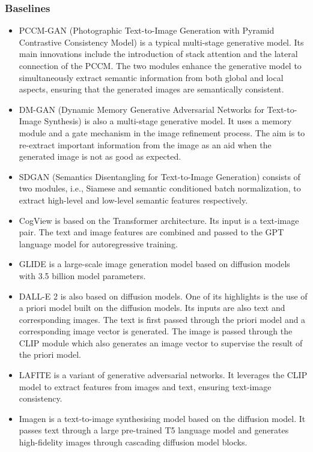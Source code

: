 \documentclass{article}
\begin{document}
\subsubsection{Baselines}
\begin{itemize}
    \item PCCM-GAN \cite{Qi2021PCCMGANPT} (Photographic Text-to-Image Generation with Pyramid Contrastive Consistency Model) is a typical multi-stage generative model. Its main innovations include the introduction of stack attention and the lateral connection of the PCCM. The two modules enhance the generative model to simultaneously extract semantic information from both global and local aspects, ensuring that the generated images are semantically consistent.
    \item DM-GAN \cite{Zhu2019DMGANDM} (Dynamic Memory Generative Adversarial Networks for Text-to-Image Synthesis) is also a multi-stage generative model. It uses a memory module and a gate mechanism in the image refinement process. The aim is to re-extract important information from the image as an aid when the generated image is not as good as expected.

    \item SDGAN \cite{Zhang2021CrossModalCL} (Semantics Disentangling for Text-to-Image Generation) consists of two modules, i.e., Siamese and semantic conditioned batch normalization, to extract high-level and low-level semantic features respectively.

    \item CogView \cite{Ding2021CogViewMT} is based on the Transformer architecture. Its input is a text-image pair. The text and image features are combined and passed to the GPT language model for autoregressive training.

    \item GLIDE \cite{Nichol2022GLIDETP} is a large-scale image generation model based on diffusion models with 3.5 billion model parameters.

    \item DALL-E 2 \cite{Ramesh2022HierarchicalTI} is also based on diffusion models. One of its highlights is the use of a priori model built on the diffusion models. Its inputs are also text and corresponding images. The text is first passed through the priori model and a corresponding image vector is generated. The image is passed through the CLIP module which also generates an image vector to supervise the result of the priori model.

    \item LAFITE \cite{Zhou2022TowardsLT} is a variant of generative adversarial networks. It leverages the CLIP model to extract features from images and text, ensuring text-image consistency.

    \item Imagen \cite{Saharia2022PhotorealisticTD} is a text-to-image synthesising model based on the diffusion model. It passes text through a large pre-trained T5 language model and generates high-fidelity images through cascading diffusion model blocks.
\end{itemize}
\end{document}
